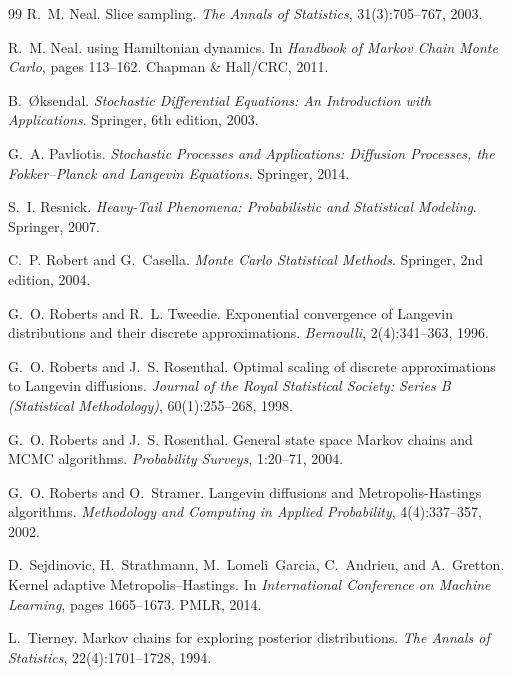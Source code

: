 \documentclass[11pt,a4paper]{report}
\begin{document}
\begin{thebibliography}{99}
R.~M. Neal.
\newblock Slice sampling.
\newblock \emph{The Annals of Statistics}, 31(3):705--767, 2003.

R.~M. Neal.
 using {H}amiltonian dynamics.
\newblock In \emph{Handbook of Markov Chain Monte Carlo}, pages 113--162.
  Chapman \& Hall/CRC, 2011.

B.~\O ksendal.
\newblock \emph{Stochastic Differential Equations: An Introduction with
  Applications}.
\newblock Springer, 6th edition, 2003.

G.~A. Pavliotis.
\newblock \emph{Stochastic Processes and Applications: Diffusion Processes,
  the {F}okker--{P}lanck and {L}angevin Equations}.
\newblock Springer, 2014.

S.~I. Resnick.
\newblock \emph{Heavy-Tail Phenomena: Probabilistic and Statistical
  Modeling}.
\newblock Springer, 2007.

C.~P. Robert and G.~Casella.
\newblock \emph{Monte Carlo Statistical Methods}.
\newblock Springer, 2nd edition, 2004.

G.~O. Roberts and R.~L. Tweedie.
\newblock Exponential convergence of {L}angevin distributions and their
  discrete approximations.
\newblock \emph{Bernoulli}, 2(4):341--363, 1996.

G.~O. Roberts and J.~S. Rosenthal.
\newblock Optimal scaling of discrete approximations to {L}angevin
  diffusions.
\newblock \emph{Journal of the Royal Statistical Society: Series B
  (Statistical Methodology)}, 60(1):255--268, 1998.

G.~O. Roberts and J.~S. Rosenthal.
\newblock General state space {M}arkov chains and {MCMC} algorithms.
\newblock \emph{Probability Surveys}, 1:20--71, 2004.

G.~O. Roberts and O.~Stramer.
\newblock Langevin diffusions and {M}etropolis-{H}astings algorithms.
\newblock \emph{Methodology and Computing in Applied Probability},
  4(4):337--357, 2002.

D.~Sejdinovic, H.~Strathmann, M.~Lomeli~Garcia, C.~Andrieu, and A.~Gretton.
\newblock Kernel adaptive {M}etropolis--{H}astings.
\newblock In \emph{International Conference on Machine Learning}, pages
  1665--1673. PMLR, 2014.

L.~Tierney.
\newblock Markov chains for exploring posterior distributions.
\newblock \emph{The Annals of Statistics}, 22(4):1701--1728, 1994.

\end{thebibliography}
\end{document}
